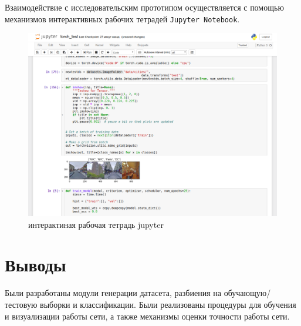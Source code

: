 Взаимодействие с исследовательским прототипом осуществляется с помощью механизмов интерактивных рабочих тетрадей \texttt{Jupyter Notebook}.

\begin{figure}[h]
	\centering
	\includegraphics[width=0.7\linewidth]{img/notebook}
	\caption{интерактиная рабочая тетрадь jupyter}
	\label{fig:notebook}
\end{figure}


\section{Выводы}

Были разработаны модули генерации датасета, разбиения на обучающую/тестовую выборки и 
классификации. Были реализованы процедуры для обучения и визуализации работы сети, а также механизмы оценки точности работы сети.
